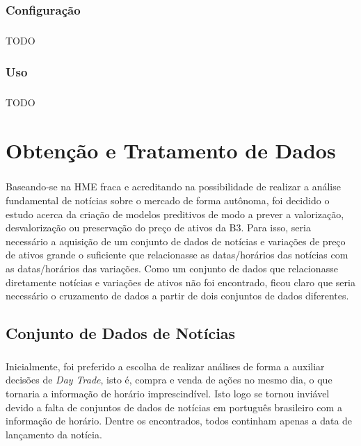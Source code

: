 \documentclass[grad,numbers]{coppe}
\begin{document}
  	\subsection{Configuração}
  		\paragraph{}TODO
  	\subsection{Uso}
  		\paragraph{}TODO
  
  \chapter{Obtenção e Tratamento de Dados}
  	\paragraph{}Baseando-se na HME fraca e acreditando na possibilidade de realizar a análise fundamental de notícias sobre o mercado de forma autônoma, foi decidido o estudo acerca da criação de modelos preditivos de modo a prever a valorização, desvalorização ou preservação do preço de ativos da B3. Para isso, seria necessário a aquisição de um conjunto de dados de notícias e variações de preço de ativos grande o suficiente que relacionasse as datas/horários das notícias com as datas/horários das variações. Como um conjunto de dados que relacionasse diretamente notícias e variações de ativos não foi encontrado, ficou claro que seria necessário o cruzamento de dados a partir de dois conjuntos de dados diferentes.
  	\section{Conjunto de Dados de Notícias}
	  	\paragraph{}Inicialmente, foi preferido a escolha de realizar análises de forma a auxiliar decisões de \textit{Day Trade}, isto é, compra e venda de ações no mesmo dia, o que tornaria a informação de horário imprescindível. Isto logo se tornou inviável devido a falta de conjuntos de dados de notícias em português brasileiro com a informação de horário. Dentre os encontrados, todos continham apenas a data de lançamento da notícia.
\end{document}
